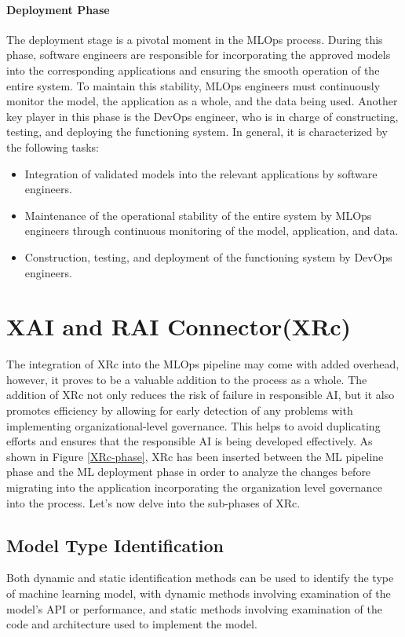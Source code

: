 \documentclass[conference]{IEEEtran}
\begin{document}
\paragraph{Deployment Phase} The deployment stage is a pivotal moment in the MLOps process. During this phase, software engineers are responsible for incorporating the approved models into the corresponding applications and ensuring the smooth operation of the entire system. To maintain this stability, MLOps engineers must continuously monitor the model, the application as a whole, and the data being used. Another key player in this phase is the DevOps engineer, who is in charge of constructing, testing, and deploying the functioning system. In general, it is characterized by the following tasks:
\begin{itemize}
	\item Integration of validated models into the relevant applications by software engineers.
	\item Maintenance of the operational stability of the entire system by MLOps engineers through continuous monitoring of the model, application, and data.
	\item Construction, testing, and deployment of the functioning system by DevOps engineers.
\end{itemize}

\section{XAI and RAI Connector(XRc)}
The integration of XRc into the MLOps pipeline may come with added overhead, however, it proves to be a valuable addition to the process as a whole. The addition of XRc not only reduces the risk of failure in responsible AI, but it also promotes efficiency by allowing for early detection of any problems with implementing organizational-level governance. This helps to avoid duplicating efforts and ensures that the responsible AI is being developed effectively. As shown in Figure \ref{XRc-phase}, XRc has been inserted between the ML pipeline phase and the ML deployment phase in order to analyze the changes before migrating into the application incorporating the organization level governance into the process. Let's now delve into the sub-phases of XRc.

\subsection{Model Type Identification}
Both dynamic and static identification methods can be used to identify the type of machine learning model, with dynamic methods involving examination of the model's API or performance, and static methods involving examination of the code and architecture used to implement the model.
\end{document}
